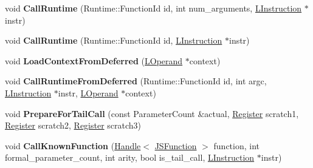 \begin{DoxyCompactItemize}
\item 
void {\bfseries Call\+Runtime} (Runtime\+::\+Function\+Id id, int num\+\_\+arguments, \hyperlink{classv8_1_1internal_1_1_l_instruction}{L\+Instruction} $\ast$instr)\hypertarget{classv8_1_1internal_1_1_l_code_gen_ac16bd03d079fe227358121f48075b4b7}{}\label{classv8_1_1internal_1_1_l_code_gen_ac16bd03d079fe227358121f48075b4b7}

\item 
void {\bfseries Call\+Runtime} (Runtime\+::\+Function\+Id id, \hyperlink{classv8_1_1internal_1_1_l_instruction}{L\+Instruction} $\ast$instr)\hypertarget{classv8_1_1internal_1_1_l_code_gen_a5a8eebd32428c2f6904e2875a4dbbb18}{}\label{classv8_1_1internal_1_1_l_code_gen_a5a8eebd32428c2f6904e2875a4dbbb18}

\item 
void {\bfseries Load\+Context\+From\+Deferred} (\hyperlink{classv8_1_1internal_1_1_l_operand}{L\+Operand} $\ast$context)\hypertarget{classv8_1_1internal_1_1_l_code_gen_a9009104c76636c80f382e04c1dd304ca}{}\label{classv8_1_1internal_1_1_l_code_gen_a9009104c76636c80f382e04c1dd304ca}

\item 
void {\bfseries Call\+Runtime\+From\+Deferred} (Runtime\+::\+Function\+Id id, int argc, \hyperlink{classv8_1_1internal_1_1_l_instruction}{L\+Instruction} $\ast$instr, \hyperlink{classv8_1_1internal_1_1_l_operand}{L\+Operand} $\ast$context)\hypertarget{classv8_1_1internal_1_1_l_code_gen_a4c3be7c7de6a86615c912e70cfc04ab4}{}\label{classv8_1_1internal_1_1_l_code_gen_a4c3be7c7de6a86615c912e70cfc04ab4}

\item 
void {\bfseries Prepare\+For\+Tail\+Call} (const Parameter\+Count \&actual, \hyperlink{structv8_1_1internal_1_1_register}{Register} scratch1, \hyperlink{structv8_1_1internal_1_1_register}{Register} scratch2, \hyperlink{structv8_1_1internal_1_1_register}{Register} scratch3)\hypertarget{classv8_1_1internal_1_1_l_code_gen_ac244b5f30d2995d51f6d263358a7ccd9}{}\label{classv8_1_1internal_1_1_l_code_gen_ac244b5f30d2995d51f6d263358a7ccd9}

\item 
void {\bfseries Call\+Known\+Function} (\hyperlink{classv8_1_1internal_1_1_handle}{Handle}$<$ \hyperlink{classv8_1_1internal_1_1_j_s_function}{J\+S\+Function} $>$ function, int formal\+\_\+parameter\+\_\+count, int arity, bool is\+\_\+tail\+\_\+call, \hyperlink{classv8_1_1internal_1_1_l_instruction}{L\+Instruction} $\ast$instr)\hypertarget{classv8_1_1internal_1_1_l_code_gen_adec87ca608c3363d2fa40b37952378b9}{}\label{classv8_1_1internal_1_1_l_code_gen_adec87ca608c3363d2fa40b37952378b9}


\end{DoxyCompactItemize}
